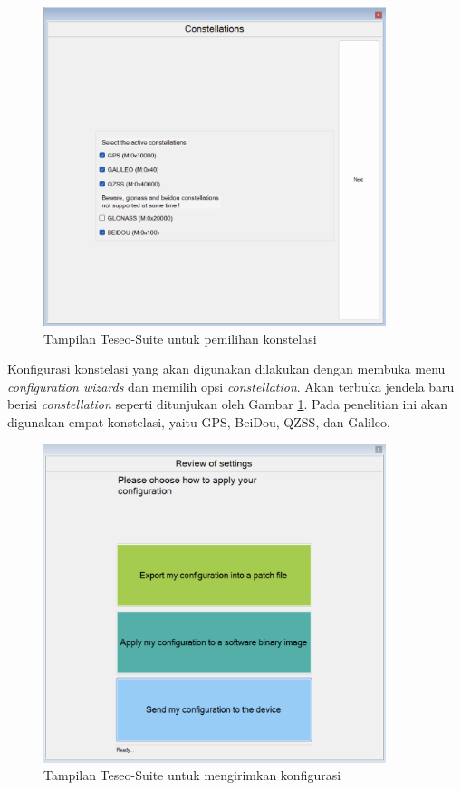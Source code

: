  \begin{figure}[H]
	\centering
	\includegraphics[width=10cm]{contents/chapter-3/setting-konstelasi/pilih-konfigurasi.png}
	\caption{Tampilan Teseo-Suite untuk pemilihan konstelasi}
	\label{Fig: pilih-konstelasi}
\end{figure}

Konfigurasi konstelasi yang akan digunakan dilakukan dengan membuka menu \textit{configuration wizards} dan memilih opsi \textit{constellation}. Akan terbuka jendela baru berisi \textit{constellation} seperti ditunjukan oleh Gambar \ref{Fig: pilih-konstelasi}. Pada penelitian ini akan digunakan empat konstelasi, yaitu GPS, BeiDou, QZSS, dan Galileo.

\begin{figure}[H]
	\centering
	\includegraphics[width=10cm]{contents/chapter-3/setting-konstelasi/kirim-konfigurasi.png}
	\caption{Tampilan Teseo-Suite untuk mengirimkan konfigurasi}
	\label{Fig: kirim-konstelasi}
\end{figure}


